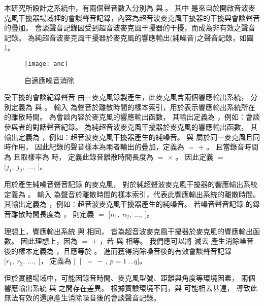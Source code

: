     本研究所設計之系統中，有兩個聲音數入分別為 \DEFrecJ 與 \DEFrecN。
其中 \DEFrecJ 是來自於開啟音波麥克風干擾器場域裡的會談聲音記錄，內容為超音波麥克風干擾器的干擾與會談聲音的疊加。
會談聲音記錄因受到超音波麥克風干擾器的干擾，而成為非有效之聲音記錄。
\DEFrecN 為純超音波麥克風干擾器於麥克風的響應輸出(純噪音)之聲音記錄，如圖 \ref{fig:anc}。

\begin{figure}[H]
    \centering
    \texttt{[image: anc]}
    \caption{自適應噪音消除}\label{fig:anc}
\end{figure}

    受干擾的會談紀錄聲音 \DEFrecJ 由一麥克風錄製產生，此麥克風含兩個響應輸出系統，
分別定義為 \DEFfuncMicConv{\DEFpause} 與 \DEFfuncMicUSJ{\DEFpause}。
輸入 \DEFpause 為聲音於離散時間的樣本索引，用於表示響應輸出系統所在的離散時間。
\DEFfuncMicConv{\DEFpause} 為會談內容於麥克風的響應輸出函數，
其輸出定義為 \DEFmicConv，例如：會談參與者的對話聲音紀錄。
\DEFfuncMicUSJ{\DEFpause} 為純超音波麥克風干擾器於麥克風的響應輸出函數，
其輸出定義為 \DEFmicUSJ，例如：超音波麥克風干擾器產生的純噪音。
\DEFfuncMicConv{\DEFpause} 與 \DEFfuncMicUSJ{\DEFpause} 屬於同一麥克風且同時作用，
因此紀錄的聲音樣本為兩者輸出的疊加，定義為 \DEFmicRecJ $=$ \DEFmicConv $+$ \DEFmicUSJ。
且當錄音時間為 \DEFtimeREC 且取樣率為 \DEFsamplerate 時，
定義此錄音離散時間長度為 \DEFtimeP $=$ \DEFsamplerate $\times$ \DEFtimeREC。
因此定義 \DEFrecJ $=$ $[j_{1}, ~j_{2}, ~ ...,~ $\DEFmicRecJ$]$。

    用於產生純噪音聲音記錄 \DEFrecN 的麥克風，
對於純超聲波麥克風干擾器的響應輸出系統定義為 \DEFfuncMicUSN{\DEFpause}。
輸入 \DEFpause 為聲音於離散時間的樣本索引，代表此響應輸出系統的離散時間。
\DEFfuncMicUSN{\DEFpause} 其輸出定義為 \DEFmicUSN ，例如：超音波麥克風干擾器產生的純噪音。
若噪音聲音記錄 \DEFrecN 的錄音離散時間長度為 \DEFtimeP，
則定義 \DEFrecN $=$ $[n_{1}, ~n_{2}, ~ ...,~ $\DEFmicUSN$]$。

    理想上，響應輸出系統 \DEFfuncMicUSN{\DEFpause} 與 \DEFfuncMicUSJ{\DEFpause} 相同，
皆為超音波麥克風干擾器於麥克風的響應輸出函數。
因此理想上，因為 \DEFmicRecJ $=$ \DEFmicConv $+$ \DEFmicUSJ，若 \DEFmicUSJ 與 \DEFmicUSN 相等。
我們應可以將 \DEFmicRecJ 減去 \DEFmicUSN 產生消除噪音後的樣本定義為 \DEFmicRecREV，且應等於 \DEFmicConv。
進而獲得消除噪音後的有效會談聲音記錄 $[r_{1}, ~r_{2}, ~ ...,~ $\DEFmicRecREV$]$，
定義為 $[$ \DEFmicRecREV $~|~$ \DEFmicRecREV $=$ \DEFmicRecJ $-$ \DEFmicUSN $,~  p=1~...q]$。

    但於實體場域中，可能因錄音時間、麥克風型號、距離與角度等環境因素，
兩個響應輸出系統 \DEFfuncMicUSN{\DEFpause} 與 \DEFfuncMicUSJ{\DEFpause} 之間存在差異。
根據實驗環境不同，\DEFmicRecREV 與 \DEFmicConv 可能相去甚遠，
導致此無法有效的還原產生消除噪音後的會談聲音記錄。

